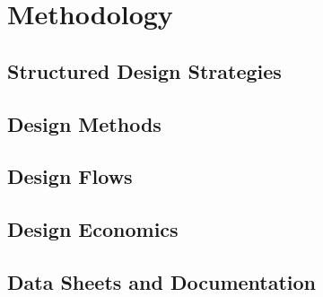 \section{Methodology}

\subsection{Structured Design Strategies}

\subsection{Design Methods}

\subsection{Design Flows}

\subsection{Design Economics}

\subsection{Data Sheets and Documentation}
